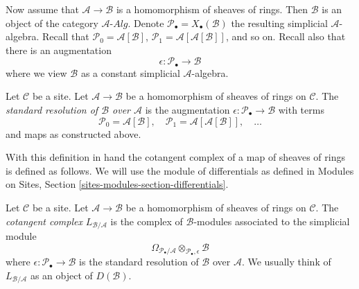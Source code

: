 \medskip\noindent
Now assume that $\mathcal{A} \to \mathcal{B}$ is a homomorphism of sheaves
of rings. Then $\mathcal{B}$ is an object of the category
$\mathcal{A}\textit{-Alg}$. Denote
$\mathcal{P}_\bullet = X_\bullet(\mathcal{B})$ the resulting
simplicial $\mathcal{A}$-algebra.
Recall that
$\mathcal{P}_0 = \mathcal{A}[\mathcal{B}]$,
$\mathcal{P}_1 = \mathcal{A}[\mathcal{A}[\mathcal{B}]]$, and so on.
Recall also that there is an augmentation
$$
\epsilon : \mathcal{P}_\bullet \longrightarrow \mathcal{B}
$$
where we view $\mathcal{B}$ as a constant simplicial $\mathcal{A}$-algebra.

\begin{definition}
\label{definition-standard-resolution-sheaves-rings}
Let $\mathcal{C}$ be a site.
Let $\mathcal{A} \to \mathcal{B}$ be a homomorphism of sheaves of rings
on $\mathcal{C}$. The {\it standard resolution of $\mathcal{B}$ over
$\mathcal{A}$} is the augmentation
$\epsilon : \mathcal{P}_\bullet \to \mathcal{B}$
with terms
$$
\mathcal{P}_0 = \mathcal{A}[\mathcal{B}],\quad
\mathcal{P}_1 = \mathcal{A}[\mathcal{A}[\mathcal{B}]],\quad \ldots
$$
and maps as constructed above.
\end{definition}

\noindent
With this definition in hand the cotangent complex of a map of sheaves
of rings is defined as follows.
We will use the module of differentials as defined in
Modules on Sites, Section \ref{sites-modules-section-differentials}.

\begin{definition}
\label{definition-cotangent-complex-morphism-sheaves-rings}
Let $\mathcal{C}$ be a site.
Let $\mathcal{A} \to \mathcal{B}$ be a homomorphism of sheaves of rings
on $\mathcal{C}$.
The {\it cotangent complex} $L_{\mathcal{B}/\mathcal{A}}$
is the complex of $\mathcal{B}$-modules associated to the
simplicial module
$$
\Omega_{\mathcal{P}_\bullet/\mathcal{A}}
\otimes_{\mathcal{P}_\bullet, \epsilon} \mathcal{B}
$$
where $\epsilon : \mathcal{P}_\bullet \to \mathcal{B}$
is the standard resolution of $\mathcal{B}$ over
$\mathcal{A}$. We usually think of $L_{\mathcal{B}/\mathcal{A}}$
as an object of $D(\mathcal{B})$.
\end{definition}


